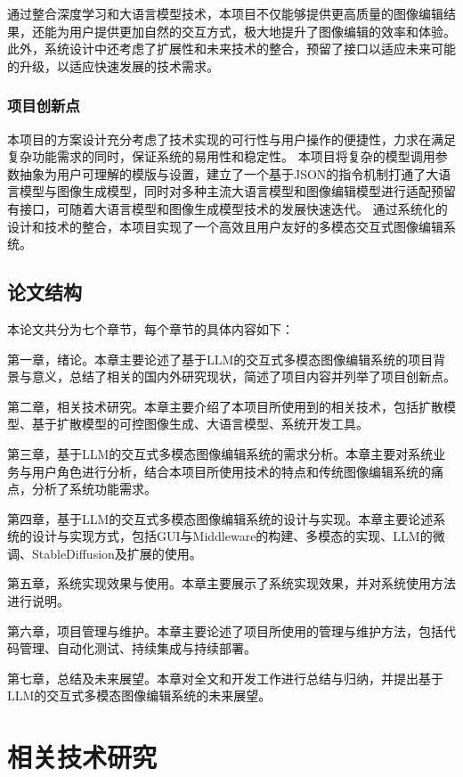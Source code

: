\documentclass[a4paper,AutoFakeBold,oneside,12pt]{book}
\begin{document}
通过整合深度学习和大语言模型技术，本项目不仅能够提供更高质量的图像编辑结果，还能为用户提供更加自然的交互方式，极大地提升了图像编辑的效率和体验。此外，系统设计中还考虑了扩展性和未来技术的整合，预留了接口以适应未来可能的升级，以适应快速发展的技术需求。

\subsection{项目创新点}
本项目的方案设计充分考虑了技术实现的可行性与用户操作的便捷性，力求在满足复杂功能需求的同时，保证系统的易用性和稳定性。
本项目将复杂的模型调用参数抽象为用户可理解的模版与设置，建立了一个基于JSON的指令机制打通了大语言模型与图像生成模型，同时对多种主流大语言模型和图像编辑模型进行适配预留有接口，可随着大语言模型和图像生成模型技术的发展快速迭代。
通过系统化的设计和技术的整合，本项目实现了一个高效且用户友好的多模态交互式图像编辑系统。

\section{论文结构}
本论文共分为七个章节，每个章节的具体内容如下：

第一章，绪论。本章主要论述了基于LLM的交互式多模态图像编辑系统的项目背景与意义，总结了相关的国内外研究现状，简述了项目内容并列举了项目创新点。

第二章，相关技术研究。本章主要介绍了本项目所使用到的相关技术，包括扩散模型、基于扩散模型的可控图像生成、大语言模型、系统开发工具。

第三章，基于LLM的交互式多模态图像编辑系统的需求分析。本章主要对系统业务与用户角色进行分析，结合本项目所使用技术的特点和传统图像编辑系统的痛点，分析了系统功能需求。

第四章，基于LLM的交互式多模态图像编辑系统的设计与实现。本章主要论述系统的设计与实现方式，包括GUI与Middleware的构建、多模态的实现、LLM的微调、StableDiffusion及扩展的使用。

第五章，系统实现效果与使用。本章主要展示了系统实现效果，并对系统使用方法进行说明。

第六章，项目管理与维护。本章主要论述了项目所使用的管理与维护方法，包括代码管理、自动化测试、持续集成与持续部署。

第七章，总结及未来展望。本章对全文和开发工作进行总结与归纳，并提出基于LLM的交互式多模态图像编辑系统的未来展望。

\chapter{相关技术研究}
\end{document}

